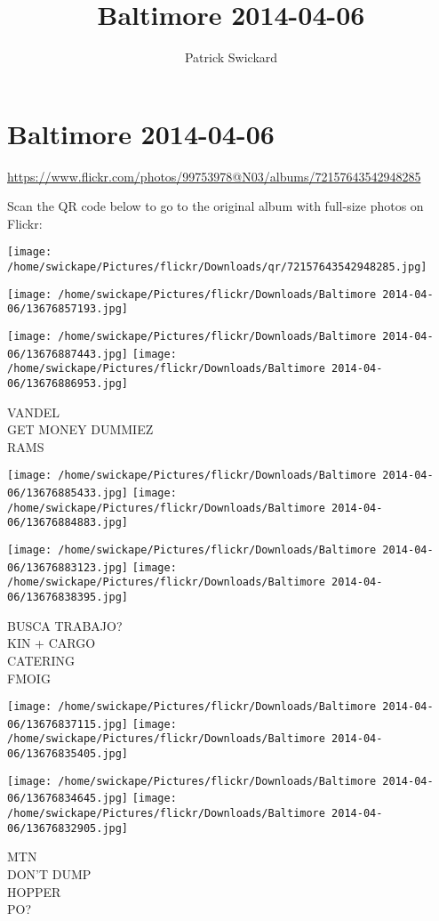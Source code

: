 \documentclass[10pt,letterpaper]{article}
\title{Baltimore 2014-04-06}
\author{Patrick Swickard}
\date{}
\begin{document}
\section*{Baltimore 2014-04-06}

\url{https://www.flickr.com/photos/99753978@N03/albums/72157643542948285}

Scan the QR code below to go to the original album with full-size photos on Flickr:

\texttt{[image: /home/swickape/Pictures/flickr/Downloads/qr/72157643542948285.jpg]}
\pagebreak

\texttt{[image: /home/swickape/Pictures/flickr/Downloads/Baltimore 2014-04-06/13676857193.jpg]}

\vspace{0.25in}
\texttt{[image: /home/swickape/Pictures/flickr/Downloads/Baltimore 2014-04-06/13676887443.jpg]}
\texttt{[image: /home/swickape/Pictures/flickr/Downloads/Baltimore 2014-04-06/13676886953.jpg]}

VANDEL\\
GET MONEY DUMMIEZ\\
RAMS
\pagebreak

\texttt{[image: /home/swickape/Pictures/flickr/Downloads/Baltimore 2014-04-06/13676885433.jpg]}
\texttt{[image: /home/swickape/Pictures/flickr/Downloads/Baltimore 2014-04-06/13676884883.jpg]}

\texttt{[image: /home/swickape/Pictures/flickr/Downloads/Baltimore 2014-04-06/13676883123.jpg]}
\texttt{[image: /home/swickape/Pictures/flickr/Downloads/Baltimore 2014-04-06/13676838395.jpg]}

BUSCA TRABAJO?\\
KIN + CARGO\\
CATERING\\
FMOIG
\pagebreak

\texttt{[image: /home/swickape/Pictures/flickr/Downloads/Baltimore 2014-04-06/13676837115.jpg]}
\texttt{[image: /home/swickape/Pictures/flickr/Downloads/Baltimore 2014-04-06/13676835405.jpg]}

\texttt{[image: /home/swickape/Pictures/flickr/Downloads/Baltimore 2014-04-06/13676834645.jpg]}
\texttt{[image: /home/swickape/Pictures/flickr/Downloads/Baltimore 2014-04-06/13676832905.jpg]}

MTN\\
DON'T DUMP\\
HOPPER\\
PO?
\pagebreak
\end{document}
